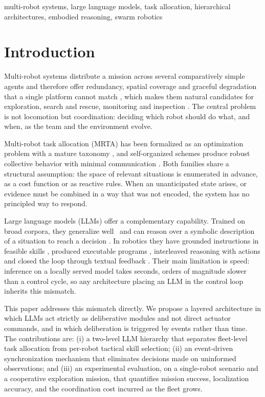 \documentclass[conference]{IEEEtran}
\begin{document}
\begin{IEEEkeywords}
multi-robot systems, large language models, task allocation, hierarchical
architectures, embodied reasoning, swarm robotics
\end{IEEEkeywords}

\section{Introduction}

Multi-robot systems distribute a mission across several comparatively
simple agents and therefore offer redundancy, spatial coverage and
graceful degradation that a single platform cannot match
\cite{torreno2017,sun2025}, which makes them natural candidates for
exploration, search and rescue, monitoring and inspection
\cite{brambilla2013}. The central problem is not locomotion but
coordination: deciding which robot should do what, and when, as the team
and the environment evolve.

Multi-robot task allocation (MRTA) has been formalized as an optimization
problem with a mature taxonomy \cite{gerkey2004,korsah2013}, and
self-organized schemes produce robust collective behavior with minimal
communication \cite{krieger2000,obute2022}. Both families share a
structural assumption: the space of relevant situations is enumerated in
advance, as a cost function or as reactive rules. When an unanticipated
state arises, or evidence must be combined in a way that was not encoded,
the system has no principled way to respond.

Large language models (LLMs) offer a complementary capability. Trained on
broad corpora, they generalize well~\cite{brown2020,bommasani2021} and can
reason over a symbolic description of a situation to reach a decision
\cite{wang2023}. In robotics they have grounded instructions in feasible
skills \cite{ahn2022}, produced executable programs \cite{liang2023},
interleaved reasoning with actions \cite{yao2022} and closed the loop
through textual feedback \cite{huang2022}. Their main limitation is
speed: inference on a locally served model takes seconds, orders of
magnitude slower than a control cycle, so any architecture placing an LLM
in the control loop inherits this mismatch.

This paper addresses this mismatch directly. We propose a layered
architecture in which LLMs act strictly as deliberative
modules and not direct actuator commands, and in which deliberation
is triggered by events rather than time. The contributions are: (i) a
two-level LLM hierarchy that separates fleet-level task allocation from
per-robot tactical skill selection; (ii) an event-driven synchronization
mechanism that eliminates decisions made on uninformed observations; and (iii)
an experimental evaluation, on a single-robot scenario and a cooperative
exploration mission, that quantifies mission success, localization
accuracy, and the coordination cost incurred as the fleet grows.
\end{document}
